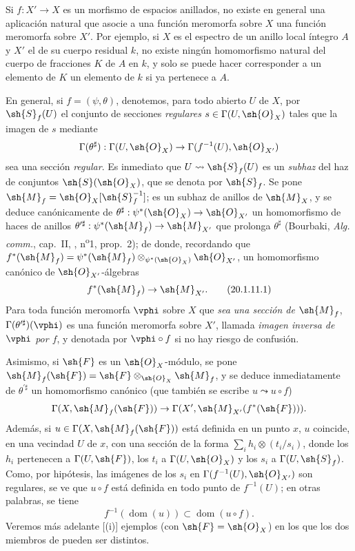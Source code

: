 \begin{env}[20.1.11]
\label{IV.20.1.11}
Si $f:X'\to X$ es un morfismo de espacios anillados, no existe en general una aplicación natural que asocie a una función meromorfa sobre $X$ una función meromorfa sobre $X'$.
Por ejemplo, si $X$ es el espectro de un anillo local íntegro $A$ y $X'$ el de su cuerpo residual $k$, no existe ningún homomorfismo natural del cuerpo de fracciones $K$ de $A$ en $k$, y solo se puede hacer corresponder a un elemento de $K$ un elemento de $k$ si ya pertenece a $A$.

En general, si $f=(\psi,\theta)$, denotemos, para todo abierto $U$ de $X$, por $\sh{S}_f(U)$ el conjunto de secciones \emph{regulares} $s\in\Gamma(U,\sh{O}_X)$ tales que la imagen de $s$ mediante
\[
  \Gamma(\theta^\sharp):\Gamma(U,\sh{O}_X)\to\Gamma(f^{-1}(U),\sh{O}_{X'})
\]
sea una sección \emph{regular}.
Es inmediato que $U\leadsto\sh{S}_f(U)$ es un \emph{subhaz} del haz de conjuntos $\sh{S}(\sh{O}_X)$, que se denota por $\sh{S}_f$.
Se pone $\sh{M}_f=\sh{O}_X[\sh{S}_f^{-1}]$; es un subhaz
de anillos de $\sh{M}_X$, y se deduce canónicamente de $\theta^\sharp:\psi^*(\sh{O}_X)\to\sh{O}_{X'}$ un homomorfismo de haces de anillos $\theta^{\prime\sharp}:\psi^*(\sh{M}_f)\to\sh{M}_{X'}$ que prolonga $\theta^\sharp$ (Bourbaki, \emph{Alg. comm.}, cap.~II, , n\textsuperscript{o}1, prop.~2); de donde, recordando que $f^*(\sh{M}_f)=\psi^*(\sh{M}_f)\otimes_{\psi^*(\sh{O}_X)}\sh{O}_{X'}$, un homomorfismo canónico de $\sh{O}_{X'}$-álgebras
\[
\label{IV.20.1.11.1}
  f^*(\sh{M}_f)\to\sh{M}_{X'}.
  \tag{20.1.11.1}
\]
Para toda función meromorfa $\vphi$ sobre $X$ que \emph{sea una sección de $\sh{M}_f$}, $\Gamma(\theta^{\prime\sharp})(\vphi)$ es una función meromorfa sobre $X'$, llamada \emph{imagen inversa de $\vphi$ por $f$}, y denotada por $\vphi\circ f$ si no hay riesgo de confusión.

Asimismo, si $\sh{F}$ es un $\sh{O}_X$-módulo, se pone $\sh{M}_f(\sh{F})=\sh{F}\otimes_{\sh{O}_X}\sh{M}_f$, y se deduce inmediatamente de $\theta^{\prime\sharp}$ un homomorfismo canónico (que también se escribe $u\leadsto u\circ f$)
\[
  \Gamma(X,\sh{M}_f(\sh{F}))\to\Gamma(X',\sh{M}_{X'}(f^*(\sh{F}))).
\]
Además, si $u\in\Gamma(X,\sh{M}_f(\sh{F}))$ está definida  en un punto $x$, $u$ coincide, en una vecindad $U$ de $x$, con una sección de la forma $\sum_i h_i\otimes(t_i/s_i)$, donde los $h_i$ pertenecen a $\Gamma(U,\sh{F})$, los $t_i$ a $\Gamma(U,\sh{O}_X)$ y los $s_i$ a $\Gamma(U,\sh{S}_f)$.
Como, por hipótesis, las imágenes de los $s_i$ en $\Gamma(f^{-1}(U),\sh{O}_{X'})$ son regulares, se ve que $u\circ f$ está definida en todo punto de $f^{-1}(U)$; en otras palabras, se tiene
\[
\label{IV.20.1.11.2}
  f^{-1}(\operatorname{dom}(u))\subset\operatorname{dom}(u\circ f).
  \tag{20.1.11.2}
\]
Veremos más adelante [(i)] ejemplos (con $\sh{F}=\sh{O}_X$) en los que los dos miembros de  pueden ser distintos.


\end{env}
